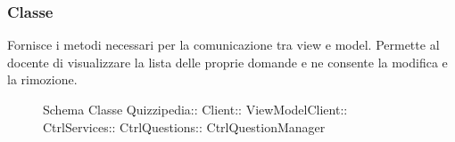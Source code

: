 \subsubsection{Classe }
Fornisce i metodi necessari per la comunicazione tra view e model. Permette al docente di visualizzare la lista delle proprie domande e ne consente la modifica e la rimozione.
\begin{figure}[H]
\centering
\noindent{}
\caption[Schema Classe CtrlQuestionManager]{Schema Classe Quizzipedia:: Client:: ViewModelClient:: CtrlServices:: CtrlQuestions:: CtrlQuestionManager}
\end{figure}
